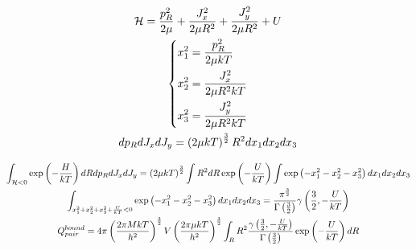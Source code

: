 \documentclass[14pt]{article}
\newcommand{\lb}{\left(}
\newcommand{\rb}{\right)}
\newcommand{\mH}{\mathcal{H}}
\begin{document}
\begin{gather}
\mH = \frac{p_R^2}{2 \mu} + \frac{J_x^2}{2 \mu R^2} + \frac{J_y^2}{2 \mu R^2} + U \notag \\
\left\{
\begin{aligned}
x_1^2 &= \frac{p_R^2}{2 \mu k T} \\
x_2^2 &= \frac{J_x^2}{2 \mu R^2 k T} \\
x_3^2 &= \frac{J_y^2}{2 \mu R^2 k T}
\end{aligned}
\right. \notag \\
d p_R d J_x d J_y = \lb 2 \mu k T \rb^{\frac{3}{2}} R^2 dx_1 dx_2 dx_3 \notag
\end{gather}

\begin{gather}
\int_{\mH < 0} \exp \lb - \frac{H}{k T} \rb dR dp_R dJ_x dJ_y = \lb 2 \mu k T \rb^{\frac{3}{2}} \int R^2 dR \exp \lb - \frac{U}{kT} \rb \int \exp \lb -x_1^2 -x_2^2 -x_3^2 \rb dx_1 dx_2 dx_3 \notag \\ 
\int_{x_1^2 + x_2^2 + x_3^2 + \frac{U}{kT} < 0} \exp \lb -x_1^2 -x_2^2 -x_3^2 \rb dx_1 dx_2 dx_3 = \frac{\pi^\frac{3}{2}}{\Gamma \lb \frac{3}{2} \rb} \gamma \lb \frac{3}{2}, - \frac{U}{kT} \rb \notag \\
Q^{bound}_{pair} = 4 \pi \lb \frac{2 \pi M k T}{h^2} \rb^\frac{3}{2} V \lb \frac{2 \pi \mu k T}{h^2} \rb^\frac{3}{2} \int_R R^2 \frac{\gamma \lb \frac{3}{2}, -\frac{U}{kT} \rb}{\Gamma \lb \frac{3}{2} \rb} \exp \lb - \frac{U}{kT} \rb dR \notag
\end{gather}
\end{document}
